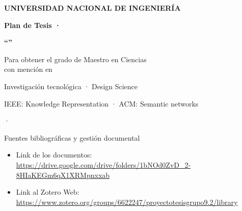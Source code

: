 \documentclass[aspectratio=169,11pt,spanish]{beamer}
\title[Plan de Tesis Grupo 9.2]{\tituloPlan}
\author{\autorAlex \and \autorJack}
\institute{\institucionDesarrollo · \grupo}
\date{\ciudad · \anioPlan}
\begin{document}
\begin{frame}[plain]
  \centering
  \vspace{0.1cm}
  {\large\bfseries UNIVERSIDAD NACIONAL DE INGENIERÍA\par}
  \vspace{0.2cm}
  {\small\bfseries Plan de Tesis · \grupo\par}
  \vspace{0.45cm}
  {\small\bfseries ``\tituloPlan''\par}
  \vspace{0.55cm}
  {\small Para obtener el grado de Maestro en Ciencias\\[0.12em]
  con mención en \mencionGrado\par}
  \vspace{0.5cm}
  {\small\bfseries \autorAlex\par}
  {\small\bfseries \autorJack\par}
  \vspace{0.35cm}
  {\small Investigación tecnológica · Design Science\par}
  {\small IEEE: Knowledge Representation · ACM: Semantic networks\par}
  \vspace{0.3cm}
  {\small \ciudad · \anioPlan\par}
\end{frame}

\begin{frame}{Fuentes bibliográficas y gestión documental}
  \marcadorNoExponer
  \vspace{0.35em}
  \begin{planpanel}
  \begin{itemize}
    \item Link de los documentos:\\[0.15em]
      {\small\url{https://drive.google.com/drive/folders/1bNOd0ZvD_2-8HIaKEGm6qX1XRMpnxxab}}
    \item Link al Zotero Web:\\[0.15em]
      {\small\url{https://www.zotero.org/groups/6622247/proyectotesisgrupo9.2/library}}
  \end{itemize}
  \end{planpanel}
\end{frame}
\end{document}
